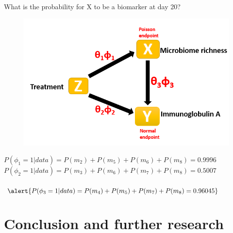 \documentclass[a4paper,9pt]{beamer}
\begin{document}



\begin{frame}{\huge{What is the probability for X to be a biomarker at day 20?}}

\begin{figure}[H]
\centering
\includegraphics[scale=0.6]{hm.PNG}
\end{figure}
\small
$P(\phi_1 = 1|data) = P(m_2) + P(m_5) + P(m_6) + P(m_8) = 0.9996$\\
$P(\phi_2 = 1|data) = P(m_3) + P(m_6) + P(m_7) + P(m_8) = 0.5007$\\
\\
$\alert{P(\phi_3 = 1|data) = P(m_4) + P(m_5) + P(m_7) + P(m_8) = 0.96045}$
\end{frame}

\section{Conclusion and further research}
\end{document}
